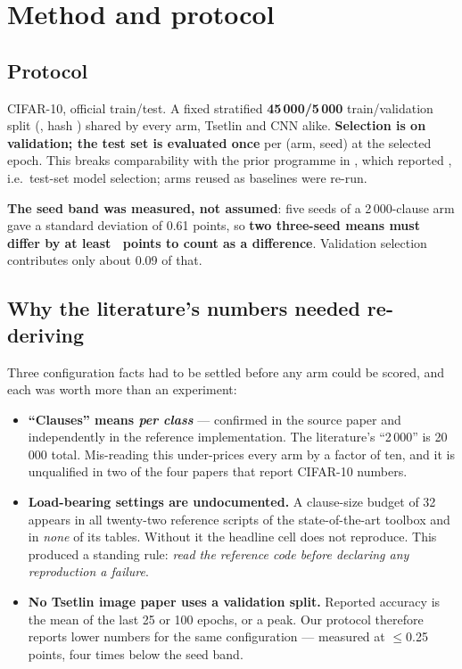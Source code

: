 \section{Method and protocol}

\subsection{Protocol}
CIFAR-10, official train/test. A fixed stratified \textbf{45\,000/5\,000} train/validation split
(, hash \code{\SplitHash}) shared by every arm, Tsetlin and CNN alike.
\textbf{Selection is on validation; the test set is evaluated once} per (arm, seed) at the selected
epoch. This breaks comparability with the prior programme in , which reported
, i.e.\ test-set model selection; arms reused as baselines were re-run.

\textbf{The seed band was measured, not assumed}: five seeds of a 2\,000-clause arm gave a standard
deviation of 0.61 points, so \textbf{two three-seed means must differ by at least \SeedBand\ points
to count as a difference}. Validation selection contributes only about 0.09 of that.

\subsection{Why the literature's numbers needed re-deriving}
Three configuration facts had to be settled before any arm could be scored, and each was worth more
than an experiment:

\begin{itemize}
\item \textbf{``Clauses'' means \emph{per class}} --- confirmed in the source paper and independently
      in the reference implementation. The literature's ``2\,000'' is 20\,000 total. Mis-reading this
      under-prices every arm by a factor of ten, and it is unqualified in two of the four papers that
      report CIFAR-10 numbers.
\item \textbf{Load-bearing settings are undocumented.} A clause-size budget of 32 appears in all
      twenty-two reference scripts of the state-of-the-art toolbox and in \emph{none} of its tables.
      Without it the headline cell does not reproduce. This produced a standing rule: \emph{read the
      reference code before declaring any reproduction a failure}.
\item \textbf{No Tsetlin image paper uses a validation split.} Reported accuracy is the mean of the
      last 25 or 100 epochs, or a peak. Our protocol therefore reports lower numbers for the same
      configuration --- measured at $\leq$0.25 points, four times below the seed band.
\end{itemize}

